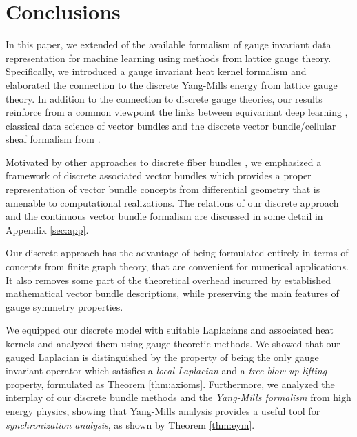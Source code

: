 \documentclass[10pt,reqno]{amsart}
\numberwithin{equation}{section}
\theoremstyle{bfnote}
\theoremstyle{bfdef}
\begin{document}
\section{Conclusions}
In this paper, we extended of the available formalism of gauge invariant data representation for machine learning \cite{weilerCoordinateIndependentConvolutional2021,gerkenGeometricDeepLearning2021} using methods from lattice gauge theory. Specifically, we introduced a gauge invariant heat kernel formalism and elaborated the connection to the discrete Yang-Mills energy from lattice gauge theory.
%
In addition to the connection to discrete gauge theories, our results reinforce from a common viewpoint the links between equivariant deep learning \cite{weilerCoordinateIndependentConvolutional2021,gerkenGeometricDeepLearning2021}, classical data science of vector bundles \cite{Singer:2012aa,batardHeatEquationsVector2011,batardClassGeneralizedLaplacians2014,batardHighOrderDIPVBTVImage2025} and the discrete vector bundle/cellular sheaf formalism from \cite{hansenSpectralTheoryCellular2019a,bodnarNeuralSheafDiffusion2023,bambergerBundleNeuralNetworks2024}.

Motivated by other approaches to discrete fiber bundles \cite{leokDiscreteTheoryConnections2005,Gattringer:2010zz,Singer:2012aa,gaoGeometrySynchronizationProblems2019}, we emphasized a framework of discrete associated vector bundles which provides a proper representation of vector bundle concepts from differential geometry that is amenable to computational realizations. The relations of our discrete approach and the continuous vector bundle formalism are discussed in some detail in Appendix \ref{sec:app}. 

Our discrete approach has the advantage of being formulated entirely in terms of concepts from finite graph theory, that are convenient for numerical applications. It also removes some part of the theoretical overhead incurred by established mathematical vector bundle descriptions, while preserving the main features of gauge symmetry properties.

We equipped our discrete model with suitable Laplacians and associated heat kernels and analyzed them using gauge theoretic methods. We showed that our gauged Laplacian is distinguished by the property of being the only gauge invariant operator which satisfies a \textit{local Laplacian} and a \textit{ tree blow-up lifting} property, formulated as Theorem \ref{thm:axioms}.
%
Furthermore, we analyzed the interplay of our discrete bundle methods and the \textit{Yang-Mills formalism} from high energy physics, showing that Yang-Mills analysis provides a useful tool for \textit{synchronization analysis}, as shown by Theorem \ref{thm:eym}.
\end{document}
